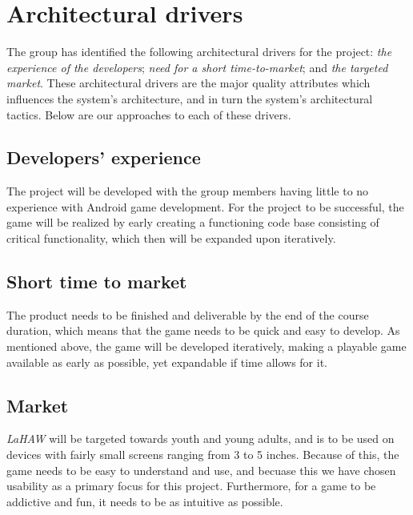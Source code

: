 \chapter{Architectural drivers}
The group has identified the following architectural drivers for the project: \emph{the experience of the developers}; \emph{need for a short time-to-market}; and \emph{the targeted market}. These architectural drivers are the major quality attributes which influences the system's architecture, and in turn the system's architectural tactics\cite{pensum}. Below are our approaches to each of these drivers.


	\section{Developers' experience}
	The project will be developed with the group members having little to no experience with Android game development. For the project to be successful, the game will be realized by early creating a functioning code base consisting of critical functionality, which then will be expanded upon iteratively.

	\section{Short time to market}
	The product needs to be finished and deliverable by the end of the course duration, which means that the game needs to be quick and easy to develop. As mentioned above, the game will be developed iteratively, making a playable game available as early as possible, yet expandable if time allows for it.

	\section{Market}
	\emph{LaHAW} will be targeted towards youth and young adults, and is to be used on devices with fairly small screens ranging from 3 to 5 inches. Because of this, the game needs to be easy to understand and use, and becuase this we have chosen usability as a primary focus for this project. Furthermore, for a game to be addictive and fun, it needs to be as intuitive as possible.

